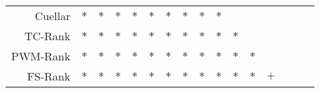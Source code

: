 \documentclass[11pt]{article}
\begin{document}
\begin{table}[h!]
\begin{center}
\begin{tabular}{ rccccccccccccccc }
    Cuellar & $*$ & $*$ & $*$ & $*$ & $*$ & $*$ & $*$ & $*$ & $*$ &     &     &     &     &     &     \\
    TC-Rank & $*$ & $*$ & $*$ & $*$ & $*$ & $*$ & $*$ & $*$ & $*$ & $*$ &     &     &     &     &     \\
    PWM-Rank & $*$ & $*$ & $*$ & $*$ & $*$ & $*$ & $*$ & $*$ & $*$ & $*$ & $*$ &     &     &     &     \\
    FS-Rank & $*$ & $*$ & $*$ & $*$ & $*$ & $*$ & $*$ & $*$ & $*$ & $*$ & $*$ & $+$ &     &     &     \\
    \hline
  \end{tabular}
\end{center}
\vspace{0.0cm}
\end{table}

\clearpage
\end{document}
